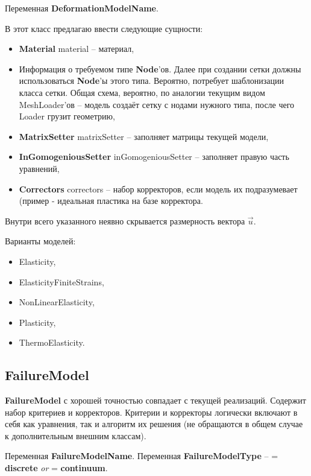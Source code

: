 \documentclass[a4paper,12pt]{article}
\numberwithin{equation}{section}
\begin{document}
	Переменная \textbf{DeformationModelName}.

	В этот класс предлагаю ввести следующие сущности:
	\begin{itemize}
		\item{\textbf{Material} material -- материал,}
		\item{Информация о требуемом типе \textbf{Node}'ов. Далее при создании сетки должны использоваться \textbf{Node}'ы этого типа. Вероятно, потребует шаблонизации класса сетки. Общая схема, вероятно, по аналогии текущим видом MeshLoader'ов -- модель создаёт сетку с нодами нужного типа, после чего Loader грузит геометрию,}
		\item{\textbf{MatrixSetter} matrixSetter -- заполняет матрицы текущей модели,}
		\item{\textbf{InGomogeniousSetter} inGomogeniousSetter -- заполняет правую часть уравнений,}
		\item{\textbf{Correctors} correctors -- набор корректоров, если модель их подразумевает (пример - идеальная пластика на базе корректора.}
	\end{itemize}

	Внутри всего указанного неявно скрывается размерность вектора $\vec{u}$.
	
	Варианты моделей:
	\begin{itemize}
		\item{Elasticity,}
		\item{ElasticityFiniteStrains,}
		\item{NonLinearElasticity,}
		\item{Plasticity,}
		\item{ThermoElasticity.}
	\end{itemize}
	
\subsection{FailureModel}

	\textbf{FailureModel} с хорошей точностью совпадает с текущей реализаций. Содержит набор критериев и корректоров. Критерии и корректоры логически включают в себя как уравнения, так и алгоритм их решения (не обращаются в общем случае к дополнительным внешним классам). 
	
	Переменная \textbf{FailureModelName}.
	Переменная \textbf{FailureModelType} -- = \textbf{discrete} \textit{or} = \textbf{continuum}.
	
\end{document}
